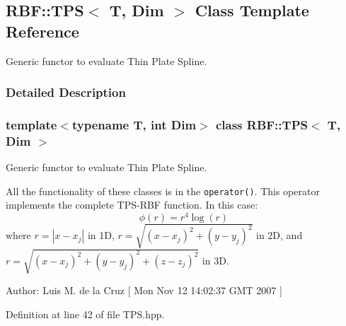 \hypertarget{classRBF_1_1TPS}{
\subsection{RBF::TPS$<$ T, Dim $>$ Class Template Reference}
\label{classRBF_1_1TPS}
}
Generic functor to evaluate Thin Plate Spline.  




\subsubsection{Detailed Description}
\subsubsection*{template$<$typename T, int Dim$>$ class RBF::TPS$<$ T, Dim $>$}

Generic functor to evaluate Thin Plate Spline. 

All the functionality of these classes is in the {\tt operator()}. This operator implements the complete TPS-RBF function. In this case: \[ \phi(r) = r^4\log(r) \] where $ r = |x - x_j| $ in 1D, $ r = \sqrt{(x - x_j)^2 + (y - y_j)^2} $ in 2D, and $ r = \sqrt{(x - x_j)^2 + (y - y_j)^2 + (z - z_j)^2} $ in 3D.

\begin{Desc}
\item[Author:]Luis M. de la Cruz \mbox{[} Mon Nov 12 14:02:37 GMT 2007 \mbox{]} \end{Desc}


Definition at line 42 of file TPS.hpp.
